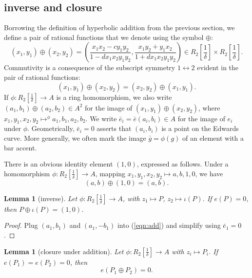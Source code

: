 \documentclass[12pt]{article}
\newtheorem{lemma}[theorem]{Lemma}
\newcommand{\f}[1]{\frac{1}{#1}}
\begin{document}
\subsection{inverse and closure}

Borrowing the definition of hyperbolic addition from the previous
section, we define a pair of rational functions that we denote using
the symbol $\oplus$:
\begin{equation}\label{eqn:add}
(x_1,y_1) \oplus (x_2,y_2) =  \left(\frac{x_1 x_2 - c y_1 y_2}{1 - d x_1 x_2 y_1 y_2},
\frac{x_1 y_2 + y_1 x_2}{1+d x_1 x_2 y_1 y_2}\right) \in R_2[\f{\delta}]\times R_2[\f{\delta}].
\end{equation}
Commutivity is a consequence of the subscript symmetry
$1\leftrightarrow 2$ evident in the pair of rational functions:
\[
(x_1,y_1) \oplus (x_2,y_2) = (x_2,y_2) \oplus (x_1,y_1).
\]
If $\phi:R_2[\f{\delta}]\to A$ is a ring homomorphism, we also write
$(a_1,b_1)\oplus (a_2,b_2)\in A^2$ for the image of $(x_1,y_1)\oplus
(x_2,y_2)$, where $x_1,y_1,x_2,y_2 \mapsto^\phi a_1,b_1,a_2,b_2$.  We
write $\bar e_i=\bar e(a_i,b_i)\in A$ for the image of $e_i$ under
$\phi$.  Geometrically, $\bar e_i=0$ asserts that $(a_i,b_i)$ is a
point on the Edwards curve.  More generally, we often mark the image
$\bar g=\phi(g)$ of an element with a bar accent.

There is an obvious identity element $(1,0)$, expressed as follows.
Under a homomorphism $\phi:R_2[\f{\delta}]\to A$, mapping
$x_1,y_1,x_2,y_2\mapsto a,b,1,0$, we have 
\begin{equation}
(a,b)\oplus(1,0) = (a,b).
\end{equation}

\begin{lemma} [inverse] 
  Let $\phi:R_2[\f{\delta}]\to A$, with $z_1\mapsto P$, $z_2\mapsto \iota(P)$.
  If $e(P)=0$, then $P\oplus \iota(P) = (1,0)$.
\end{lemma}

\begin{proof} Plug $(a_1,b_1)$ and $(a_1,-b_1)$ into (\ref{eqn:add})
  and simplify using $\bar e_1=0$.
\end{proof}

\begin{lemma}[closure under addition]\label{lemma:closure}
  Let $\phi:R_2[\f{\delta}]\to A$ with $z_i\mapsto P_i$.
  If $e(P_1)=e(P_2)=0$, then
  \[
  e(P_1 \oplus P_2) = 0.
  \]
\end{lemma}
\end{document}
